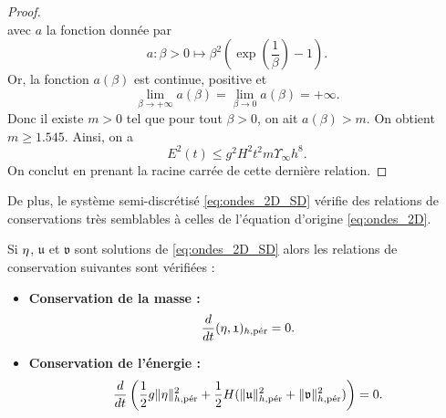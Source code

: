 \begin{proof}
\begin{equation}
\end{equation}
avec $a$ la fonction donnée par
\begin{equation}
a : \beta > 0 \mapsto \beta^2 \left( \exp \left(\dfrac{1}{\beta} \right) -1 \right).
\end{equation}
Or, la fonction $a(\beta)$ est continue, positive et
\begin{equation}
\lim_{\beta \rightarrow + \infty} a(\beta) = \lim_{\beta \rightarrow 0} a(\beta) = + \infty.
\end{equation}
Donc il existe $m>0$ tel que pour tout $\beta>0$, on ait $a(\beta)>m$. On obtient $m \geq 1.545$. Ainsi, on a
\begin{equation}
E^2(t) \leq g^2 H^2 t^2 m \Upsilon_{\infty} h^8.
\end{equation}
On conclut en prenant la racine carrée de cette dernière relation.
\end{proof}

De plus, le système semi-discrétisé \eqref{eq:ondes_2D_SD} vérifie des relations de conservations très semblables à celles de l'équation d'origine \eqref{eq:ondes_2D}.

\begin{proposition}
Si $\etafrak$, $\mathfrak{u}$ et $\mathfrak{v}$ sont solutions de \eqref{eq:ondes_2D_SD} alors les relations de conservation suivantes sont vérifiées :
\begin{itemize}
\item \textbf{Conservation de la masse :}
\begin{equation}
\dfrac{d}{dt} (\etafrak, \mathfrak{1})_{h,\per} = 0.
\end{equation}
\item \textbf{Conservation de l'énergie :}
\begin{equation}
\dfrac{d}{dt} \left( \dfrac{1}{2} g \| \etafrak \|_{h,\per}^2 + \dfrac{1}{2} H ( \| \mathfrak{u} \|_{h,\per}^2 +  \| \mathfrak{v} \|_{h,\per}^2) \right) = 0.
\end{equation}
\end{itemize}
\end{proposition}

